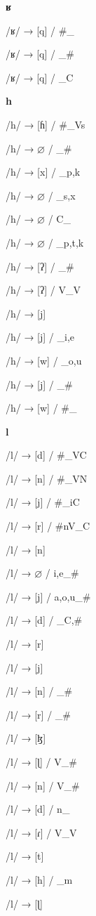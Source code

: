 \begin{center}\textbf{ʁ}\end{center}
\begin{multicols}{4}
\noindent /ʁ/ → [q] / \#\_

\noindent /ʁ/ → [q] / \_\#

\noindent /ʁ/ → [q] / \_C

\end{multicols}

\begin{center}\textbf{h}\end{center}
\begin{multicols}{4}
\noindent /h/ → [ɦ] / \#\_Vs

\noindent /h/ → $\varnothing$ / \_\#

\noindent /h/ → [x] / \_{p,k}

\noindent /h/ → $\varnothing$ / \_{s,x}

\noindent /h/ → $\varnothing$ / C\_

\noindent /h/ → $\varnothing$ / \_{p,t,k}

\noindent /h/ → [ʔ] / \_\#

\noindent /h/ → [ʔ] / V\_V

\noindent /h/ → [j]

\noindent /h/ → [j] / \_{i,e}

\noindent /h/ → [w] / \_{o,u}

\noindent /h/ → [j] / \_\#

\noindent /h/ → [w] / \#\_

\end{multicols}

\begin{center}\textbf{l}\end{center}
\begin{multicols}{4}
\noindent /l/ → [d] / \#\_VC

\noindent /l/ → [n] / \#\_VN

\noindent /l/ → [j] / \#\_iC

\noindent /l/ → [r] / \#nV\_C

\noindent /l/ → [n]

\noindent /l/ → $\varnothing$ / {i,e}\_\#

\noindent /l/ → [j] / {a,o,u}\_\#

\noindent /l/ → [d] / \_{C,\#}

\noindent /l/ → [r]

\noindent /l/ → [j]

\noindent /l/ → [n] / \_\#

\noindent /l/ → [r] / \_\#

\noindent /l/ → [ɮ]

\noindent /l/ → [ɭ] / V\_\#

\noindent /l/ → [n] / V\_\#

\noindent /l/ → [d] / n\_

\noindent /l/ → [ɾ] / V\_V

\noindent /l/ → [t]

\noindent /l/ → [h] / \_m

\noindent /l/ → [ɭ]

\end{multicols}

